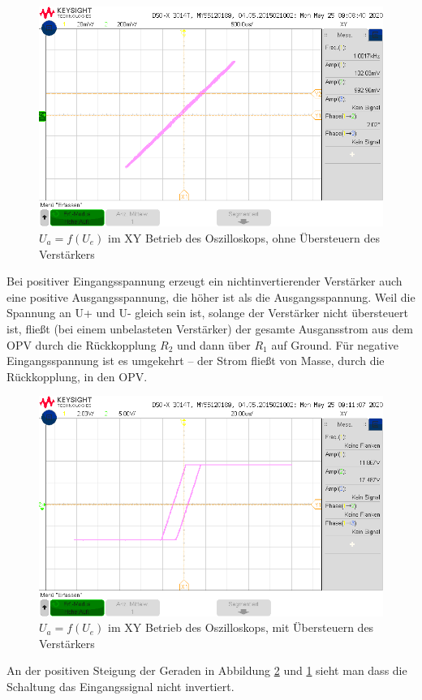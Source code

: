 \begin{figure}[H]
    \centering
    \includegraphics[width=\costumPicWidth]{Lab_1/Messungen/niinv_verst/xy_ohne_uebersteuern_1.png}
    \caption{$U_a = f(U_e)$ im XY Betrieb des Oszilloskops, ohne Übersteuern des Verstärkers }
    \label{fig:niinv_ohne_Uebersteuern}
\end{figure}

Bei positiver Eingangsspannung erzeugt ein nichtinvertierender Verstärker auch eine positive Ausgangsspannung, die höher ist als die Ausgangsspannung. Weil die Spannung an U+ und U- gleich sein ist, solange der Verstärker nicht übersteuert ist, fließt (bei einem unbelasteten Verstärker) der gesamte Ausgansstrom aus dem OPV durch die Rückkopplung $R_2$ und dann über $R_1$ auf Ground. Für negative Eingangsspannung ist es umgekehrt – der Strom fließt von Masse, durch die Rückkopplung, in den OPV.
\begin{figure}[H]
    \centering
    \includegraphics[width=\costumPicWidth]{Lab_1/Messungen/niinv_verst/xy_mit_uebersteuern_1.png}
    \caption{$U_a = f(U_e)$ im XY Betrieb des Oszilloskops, mit Übersteuern des Verstärkers}
    \label{fig:niinv_mit_Uebersteuern}
\end{figure}
An der positiven Steigung der Geraden in Abbildung \ref{fig:niinv_mit_Uebersteuern} und \ref{fig:niinv_ohne_Uebersteuern} sieht man dass die Schaltung das Eingangssignal nicht invertiert.

